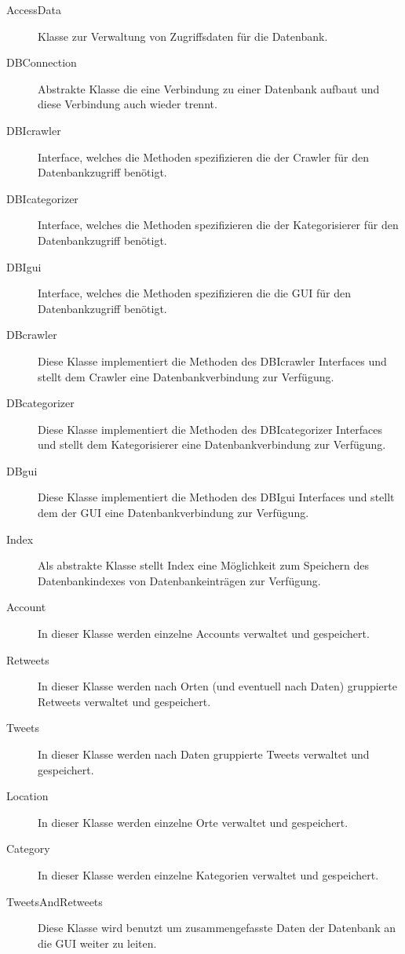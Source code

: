 \begin{description}
	\item[AccessData] Klasse zur Verwaltung von Zugriffsdaten für die Datenbank.
	\item[DBConnection] Abstrakte Klasse die eine Verbindung zu einer Datenbank aufbaut und diese Verbindung auch wieder trennt.
	\item[DBIcrawler] Interface, welches die Methoden spezifizieren die der Crawler für den Datenbankzugriff benötigt.
	\item[DBIcategorizer] Interface, welches die Methoden spezifizieren die der Kategorisierer für den Datenbankzugriff benötigt.
	\item[DBIgui] Interface, welches die Methoden spezifizieren die die GUI für den Datenbankzugriff benötigt.
	\item[DBcrawler] Diese Klasse implementiert die Methoden des DBIcrawler Interfaces und stellt dem Crawler eine Datenbankverbindung zur Verfügung.
	\item[DBcategorizer] Diese Klasse implementiert die Methoden des DBIcategorizer Interfaces und stellt dem Kategorisierer eine Datenbankverbindung zur Verfügung.
	\item[DBgui] Diese Klasse implementiert die Methoden des DBIgui Interfaces und stellt dem der GUI eine Datenbankverbindung zur Verfügung.
	\item[Index] Als abstrakte Klasse stellt Index eine Möglichkeit zum Speichern des Datenbankindexes von Datenbankeinträgen zur Verfügung.
	\item[Account] In dieser Klasse werden einzelne Accounts verwaltet und gespeichert.
	\item[Retweets] In dieser Klasse werden nach Orten (und eventuell nach Daten) gruppierte Retweets verwaltet und gespeichert.
	\item[Tweets] In dieser Klasse werden nach Daten gruppierte Tweets verwaltet und gespeichert.
	\item[Location] In dieser Klasse werden einzelne Orte verwaltet und gespeichert.
	\item[Category] In dieser Klasse werden einzelne Kategorien verwaltet und gespeichert.
	\item[TweetsAndRetweets] Diese Klasse wird benutzt um zusammengefasste Daten der Datenbank an die GUI weiter zu leiten.
\end{description}

